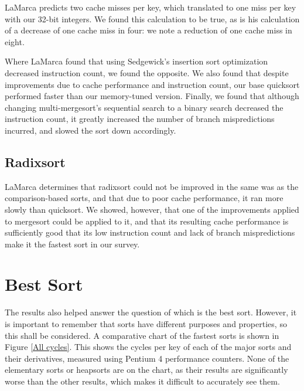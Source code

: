 LaMarca predicts two cache misses per key, which translated to one miss per key
with our 32-bit integers. We found this calculation to be true, as is his
calculation of a decrease of one cache miss in four: we note a reduction of one
cache miss in eight.

Where LaMarca found that using Sedgewick's insertion sort optimization decreased
instruction count, we found the opposite. We also found that despite
improvements due to cache performance and instruction count, our base quicksort
performed faster than our memory-tuned version. Finally, we found that although
changing multi-mergesort's sequential search to a binary search decreased the
instruction count, it greatly increased the number of branch mispredictions
incurred, and slowed the sort down accordingly.


\subsection{Radixsort}

LaMarca determines that radixsort could not be improved in the same was as the
comparison-based sorts, and that due to poor cache performance, it ran more
slowly than quicksort. We showed, however, that one of the improvements applied
to mergesort could be applied to it, and that its resulting cache performance is
sufficiently good that its low instruction count and lack of branch
mispredictions make it the fastest sort in our survey.


\section{Best Sort}

The results also helped answer the question of which is the best sort. However,
it is important to remember that sorts have different purposes and properties,
so this shall be considered. A comparative chart of the fastest sorts is shown
in Figure \ref{All cycles}. This shows the cycles per key of each of the major
sorts and their derivatives, measured using Pentium 4 performance counters.
None of the elementary sorts or heapsorts are on the chart, as their results
are significantly worse than the other results, which makes it difficult to
accurately see them.

